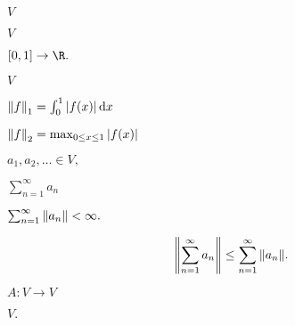 \documentclass[10pt]{book}
\begin{document}
\begin{mdSnippets}
\begin{mdInlineSnippet}[5206560a306a2e085a437fd258eb57ce]%
$V$\end{mdInlineSnippet}%
\begin{mdInlineSnippet}[5206560a306a2e085a437fd258eb57ce]%
$V$\end{mdInlineSnippet}%
\begin{mdInlineSnippet}%
$[0,1] \to \R.$\end{mdInlineSnippet}%
\begin{mdInlineSnippet}[5206560a306a2e085a437fd258eb57ce]%
$V$\end{mdInlineSnippet}%
\begin{mdInlineSnippet}%
$\norm{f}_1 = \int_0^1 \left\vert f(x)\right\vert \dd{x}$\end{mdInlineSnippet}%
\begin{mdInlineSnippet}%
$\norm{f}_2 = \max_{0 \le x \le 1} \left\vert f(x)\right\vert$\end{mdInlineSnippet}%
\begin{mdInlineSnippet}[69e3271e98f8e97c1304ed44c550eb78]%
$a_1, a_2, \dots \in V,$\end{mdInlineSnippet}%
\begin{mdInlineSnippet}[54ba1b9ca3c516d292b7f143b13c2d99]%
$\sum_{n=1}^\infty a_n$\end{mdInlineSnippet}%
\begin{mdInlineSnippet}[2315872774f71c6c798bfa2709e5292c]%
$\sum_{n=1}^\infty \norm{a_n} < \infty.$\end{mdInlineSnippet}%
\begin{mdDisplaySnippet}[c2c199e3ae25968cc2af2322b891ff2c]%
\[%
\norm{\sum_{n=1}^\infty a_n} \le \sum_{n=1}^\infty \norm{a_n}.
\]%
\end{mdDisplaySnippet}%
\begin{mdInlineSnippet}[3803e0504fbff96c773375f64b1287d1]%
$A: V \to V$\end{mdInlineSnippet}%
\begin{mdInlineSnippet}%
$V.$\end{mdInlineSnippet}%
\begin{mdInlineSnippet}[7fc56270e7a70fa81a5935b72eacbe29]%

\end{mdInlineSnippet}
\end{mdSnippets}
\end{document}
